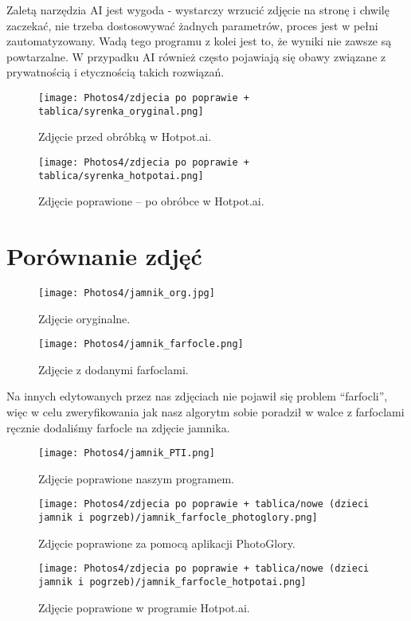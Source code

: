 \documentclass[]{mwart}
\begin{document}
Zaletą narzędzia AI jest wygoda - wystarczy wrzucić zdjęcie na stronę i chwilę zaczekać, nie trzeba dostosowywać żadnych parametrów, proces jest w pełni zautomatyzowany. Wadą tego programu z kolei jest to, że wyniki nie zawsze są powtarzalne. W przypadku AI również często pojawiają się obawy związane z prywatnością i etycznością takich rozwiązań.

\newpage
\begin{figure}[H]
    \centering
    \texttt{[image: Photos4/zdjecia po poprawie + tablica/syrenka\_oryginal.png]}
    \caption{Zdjęcie przed obróbką w Hotpot.ai.}
\end{figure}
\begin{figure}[H]
    \centering
    \texttt{[image: Photos4/zdjecia po poprawie + tablica/syrenka\_hotpotai.png]}
    \caption{Zdjęcie poprawione -- po obróbce w Hotpot.ai.}
\end{figure}

\newpage
\section{Porównanie zdjęć}
\begin{figure}[H]
    \centering
    \texttt{[image: Photos4/jamnik\_org.jpg]}
    \caption{Zdjęcie oryginalne.}
\end{figure}

\newpage

\begin{figure}[H]
    \centering
    \texttt{[image: Photos4/jamnik\_farfocle.png]}
    \caption{Zdjęcie z dodanymi farfoclami. }
\end{figure}


Na innych edytowanych przez nas zdjęciach nie pojawił się problem “farfocli”, więc w celu zweryfikowania jak nasz algorytm sobie poradził w walce z farfoclami ręcznie dodaliśmy farfocle na zdjęcie jamnika.

\newpage

\begin{figure}[H]
    \centering
    \texttt{[image: Photos4/jamnik\_PTI.png]}
    \caption{Zdjęcie poprawione naszym programem.}
\end{figure}

\newpage

\begin{figure}[H]
    \centering
    \texttt{[image: Photos4/zdjecia po poprawie + tablica/nowe (dzieci jamnik i pogrzeb)/jamnik\_farfocle\_photoglory.png]}
    \caption{Zdjęcie poprawione za pomocą aplikacji PhotoGlory.}
\end{figure}
\begin{figure}[H]
    \centering
    \texttt{[image: Photos4/zdjecia po poprawie + tablica/nowe (dzieci jamnik i pogrzeb)/jamnik\_farfocle\_hotpotai.png]}
    \caption{Zdjęcie poprawione w programie Hotpot.ai.}
\end{figure}
\end{document}
